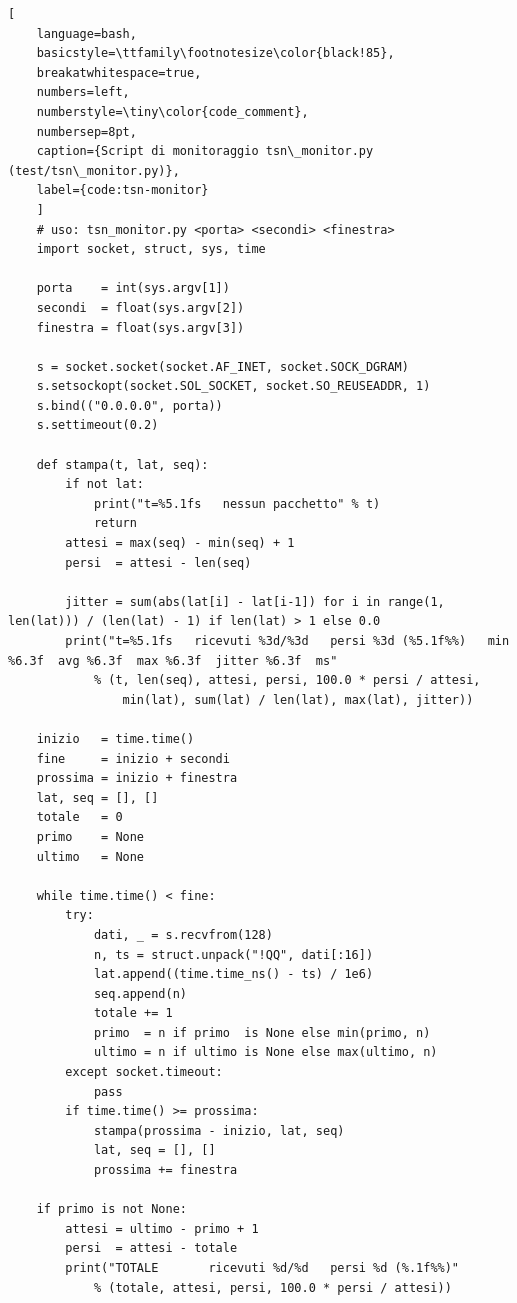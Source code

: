 \documentclass[12pt,a4paper,twoside]{book}
\begin{document}
\begin{onehalfspace}
\begin{lstlisting}[
    language=bash,
    basicstyle=\ttfamily\footnotesize\color{black!85},
    breakatwhitespace=true,
    numbers=left,
    numberstyle=\tiny\color{code_comment},
    numbersep=8pt,
    caption={Script di monitoraggio tsn\_monitor.py (test/tsn\_monitor.py)},
    label={code:tsn-monitor}
    ]
    # uso: tsn_monitor.py <porta> <secondi> <finestra>
    import socket, struct, sys, time

    porta    = int(sys.argv[1])
    secondi  = float(sys.argv[2])
    finestra = float(sys.argv[3])

    s = socket.socket(socket.AF_INET, socket.SOCK_DGRAM)
    s.setsockopt(socket.SOL_SOCKET, socket.SO_REUSEADDR, 1)
    s.bind(("0.0.0.0", porta))
    s.settimeout(0.2)

    def stampa(t, lat, seq):
        if not lat:
            print("t=%5.1fs   nessun pacchetto" % t)
            return
        attesi = max(seq) - min(seq) + 1
        persi  = attesi - len(seq)

        jitter = sum(abs(lat[i] - lat[i-1]) for i in range(1, len(lat))) / (len(lat) - 1) if len(lat) > 1 else 0.0
        print("t=%5.1fs   ricevuti %3d/%3d   persi %3d (%5.1f%%)   min %6.3f  avg %6.3f  max %6.3f  jitter %6.3f  ms"
            % (t, len(seq), attesi, persi, 100.0 * persi / attesi,
                min(lat), sum(lat) / len(lat), max(lat), jitter))

    inizio   = time.time()
    fine     = inizio + secondi
    prossima = inizio + finestra
    lat, seq = [], []
    totale   = 0
    primo    = None
    ultimo   = None

    while time.time() < fine:
        try:
            dati, _ = s.recvfrom(128)
            n, ts = struct.unpack("!QQ", dati[:16])
            lat.append((time.time_ns() - ts) / 1e6)
            seq.append(n)
            totale += 1
            primo  = n if primo  is None else min(primo, n)
            ultimo = n if ultimo is None else max(ultimo, n)
        except socket.timeout:
            pass
        if time.time() >= prossima:
            stampa(prossima - inizio, lat, seq)
            lat, seq = [], []
            prossima += finestra

    if primo is not None:
        attesi = ultimo - primo + 1
        persi  = attesi - totale
        print("TOTALE       ricevuti %d/%d   persi %d (%.1f%%)"
            % (totale, attesi, persi, 100.0 * persi / attesi))

\end{lstlisting}


\end{onehalfspace}
\end{document}
